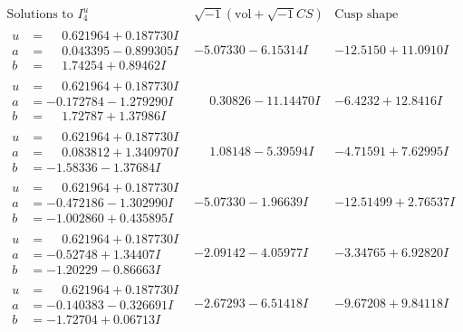 \documentclass[1p]{elsarticle_modified}
\theoremstyle{definition}
\newcommand{\I}{\sqrt{-1}}
\begin{document}
$$\begin{array}{c|c|c}  
\text{Solutions to }I^u_{4}& \I (\text{vol} + \sqrt{-1}CS) & \text{Cusp shape}\\
 \hline 
\begin{aligned}
u &= \phantom{-}0.621964 + 0.187730 I \\
a &= \phantom{-}0.043395 - 0.899305 I \\
b &= \phantom{-}1.74254 + 0.89462 I\end{aligned}
 & -5.07330 - 6.15314 I & -12.5150 + 11.0910 I \\ \hline\begin{aligned}
u &= \phantom{-}0.621964 + 0.187730 I \\
a &= -0.172784 - 1.279290 I \\
b &= \phantom{-}1.72787 + 1.37986 I\end{aligned}
 & \phantom{-}0.30826 - 11.14470 I & -6.4232 + 12.8416 I \\ \hline\begin{aligned}
u &= \phantom{-}0.621964 + 0.187730 I \\
a &= \phantom{-}0.083812 + 1.340970 I \\
b &= -1.58336 - 1.37684 I\end{aligned}
 & \phantom{-}1.08148 - 5.39594 I & -4.71591 + 7.62995 I \\ \hline\begin{aligned}
u &= \phantom{-}0.621964 + 0.187730 I \\
a &= -0.472186 - 1.302990 I \\
b &= -1.002860 + 0.435895 I\end{aligned}
 & -5.07330 - 1.96639 I & -12.51499 + 2.76537 I \\ \hline\begin{aligned}
u &= \phantom{-}0.621964 + 0.187730 I \\
a &= -0.52748 + 1.34407 I \\
b &= -1.20229 - 0.86663 I\end{aligned}
 & -2.09142 - 4.05977 I & -3.34765 + 6.92820 I \\ \hline\begin{aligned}
u &= \phantom{-}0.621964 + 0.187730 I \\
a &= -0.140383 - 0.326691 I \\
b &= -1.72704 + 0.06713 I\end{aligned}
 & -2.67293 - 6.51418 I & -9.67208 + 9.84118 I \\ \hline\begin{aligned}

\end{aligned}
\end{array}$$
\end{document}
